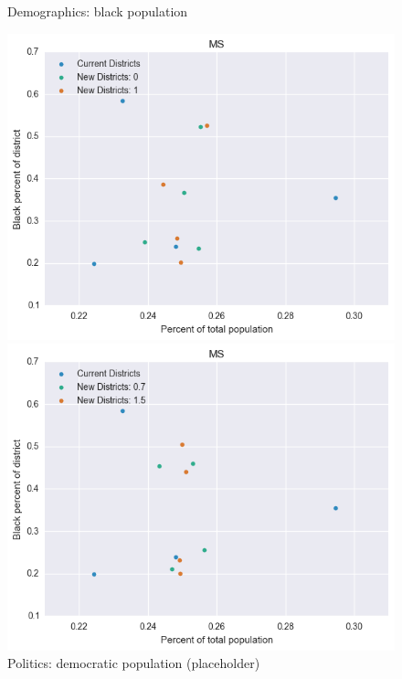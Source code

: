 \begin{figure}[htb!] \centering
\caption{ Demographics: black population }
\includegraphics[width=4.5in]{../analysis/MS/analysis_scatter.png}
\caption{ Politics: democratic population (placeholder)}
\includegraphics[width=4.5in]{../analysis/MS/analysis_scatter2.png}
\end{figure}

\clearpage
\newpage

